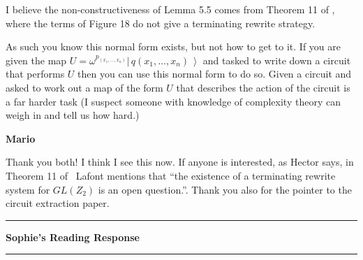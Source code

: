 \documentclass{amsart}
\newcommand{\iam}[1]{
  \vspace{0.25em}
  \hrule
  \vspace{0.25em}
  \textbf{{#1}'s Reading Response}
  \vspace{0.25em}
  \hrule
  \vspace{1em}
}
\newcommand{\respond}[1]{
  \vspace{1em} \textbf{#1}
}
\newcommand\ket[1]{\left|\, #1 \, \right>}
\begin{document}
I believe the non-constructiveness of Lemma 5.5 comes from Theorem 11 of \cite{LafontBooleanCircuits},
where the terms of Figure 18 do not give a terminating rewrite strategy.

As such you know this normal form exists, but not how to get to it.
If you are given the map $U = \omega^{p_(x_1, \dots, x_n)}\ket{q(x_1, \dots, x_n)}$
and tasked to write down a circuit that performs $U$ then you can use this normal form to do so.
Given a circuit and asked to work out a map of the form $U$ that describes the action of the circuit is a far harder task
(I suspect someone with knowledge of complexity theory can weigh in and tell us how hard.)

\respond{Mario}

Thank you both! I think I see this now. If anyone is interested, as
Hector says, in Theorem 11 of~\cite{LafontBooleanCircuits} Lafont
mentions that ``the existence of a terminating rewrite system for
$GL(Z_2)$ is an open question.''.  Thank you also for the pointer to
the circuit extraction paper.

\iam{Sophie}
\end{document}
